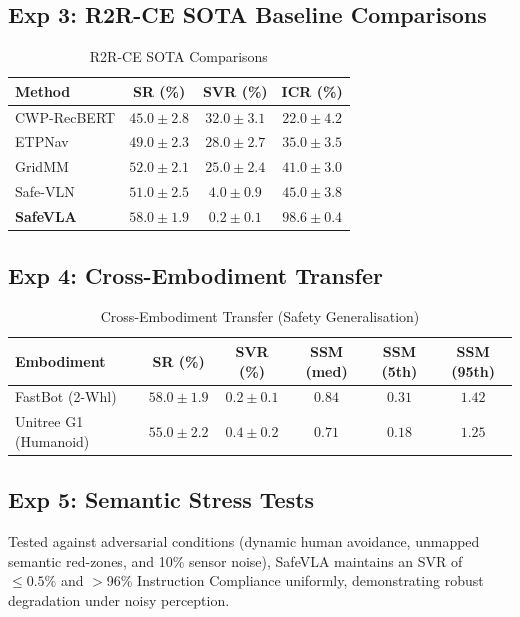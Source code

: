 \documentclass[conference]{IEEEtran}
\begin{document}
\subsection{Exp 3: R2R-CE SOTA Baseline Comparisons}
\begin{table}[h]
\centering
\caption{R2R-CE SOTA Comparisons}
\begin{tabular}{lccc}
\toprule
\textbf{Method} & \textbf{SR (\%)} & \textbf{SVR (\%)} & \textbf{ICR (\%)} \\
\midrule
CWP-RecBERT & $45.0 \pm 2.8$ & $32.0 \pm 3.1$ & $22.0 \pm 4.2$ \\
ETPNav & $49.0 \pm 2.3$ & $28.0 \pm 2.7$ & $35.0 \pm 3.5$ \\
GridMM & $52.0 \pm 2.1$ & $25.0 \pm 2.4$ & $41.0 \pm 3.0$ \\
Safe-VLN & $51.0 \pm 2.5$ & $4.0 \pm 0.9$ & $45.0 \pm 3.8$ \\
\textbf{SafeVLA} & $\mathbf{58.0 \pm 1.9}$ & $\mathbf{0.2 \pm 0.1}$ & $\mathbf{98.6 \pm 0.4}$ \\
\bottomrule
\end{tabular}
\end{table}

\subsection{Exp 4: Cross-Embodiment Transfer}
\begin{table}[h]
\centering
\caption{Cross-Embodiment Transfer (Safety Generalisation)}
\footnotesize
\begin{tabular}{@{}lccccc@{}}
\toprule
\textbf{Embodiment} & \textbf{SR (\%)} & \textbf{SVR (\%)} & \textbf{SSM (med)} & \textbf{SSM (5th)} & \textbf{SSM (95th)} \\
\midrule
FastBot (2-Whl) & $58.0 \pm 1.9$ & $0.2 \pm 0.1$ & $0.84$ & $0.31$ & $1.42$ \\
Unitree G1 (Humanoid) & $55.0 \pm 2.2$ & $0.4 \pm 0.2$ & $0.71$ & $0.18$ & $1.25$ \\
\bottomrule
\end{tabular}
\end{table}

\subsection{Exp 5: Semantic Stress Tests}
Tested against adversarial conditions (dynamic human avoidance, unmapped semantic red-zones, and 10\% sensor noise), SafeVLA maintains an SVR of $\le 0.5\%$ and $>$96\% Instruction Compliance uniformly, demonstrating robust degradation under noisy perception.
\end{document}
